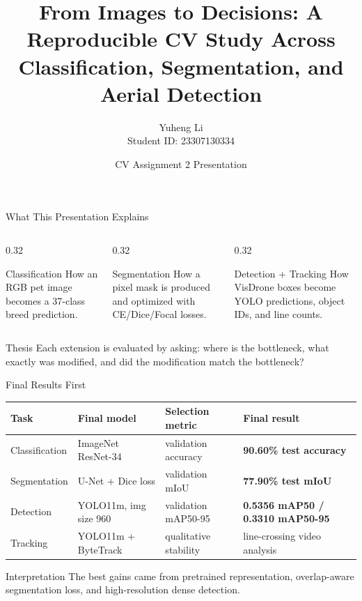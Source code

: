 \documentclass[aspectratio=169,9pt]{beamer}
\title[CV Assignment 2]{From Images to Decisions: A Reproducible CV Study Across Classification, Segmentation, and Aerial Detection}
\author[Yuheng Li]{\texorpdfstring{Yuheng Li\\Student ID: 23307130334}{Yuheng Li, Student ID: 23307130334}}
\institute{GitHub: \href{https://github.com/yuheng-li-ai/CV_Midterm}{CV\_Midterm}\\ModelScope: \href{https://www.modelscope.cn/models/yuhengli/cv-hw2-final-model}{cv-hw2-final-model}}
\date{CV Assignment 2 Presentation}
\begin{document}
\begin{frame}
  \titlepage
\end{frame}

\begin{frame}{What This Presentation Explains}
  \begin{columns}[T]
    \begin{column}{0.32\textwidth}
      \begin{block}{Classification}
        How an RGB pet image becomes a 37-class breed prediction.
      \end{block}
    \end{column}
    \begin{column}{0.32\textwidth}
      \begin{block}{Segmentation}
        How a pixel mask is produced and optimized with CE/Dice/Focal losses.
      \end{block}
    \end{column}
    \begin{column}{0.32\textwidth}
      \begin{block}{Detection + Tracking}
        How VisDrone boxes become YOLO predictions, object IDs, and line counts.
      \end{block}
    \end{column}
  \end{columns}
  \vspace{0.7em}
  \begin{block}{Thesis}
    Each extension is evaluated by asking: where is the bottleneck, what exactly was modified, and did the modification match the bottleneck?
  \end{block}
\end{frame}

\begin{frame}{Final Results First}
  \begin{table}
    \centering
    \small
    \begin{tabular}{llll}
      \toprule
      Task & Final model & Selection metric & Final result\\
      \midrule
      Classification & ImageNet ResNet-34 & validation accuracy & \textbf{90.60\% test accuracy}\\
      Segmentation & U-Net + Dice loss & validation mIoU & \textbf{77.90\% test mIoU}\\
      Detection & YOLO11m, img size 960 & validation mAP50-95 & \textbf{0.5356 mAP50 / 0.3310 mAP50-95}\\
      Tracking & YOLO11m + ByteTrack & qualitative stability & line-crossing video analysis\\
      \bottomrule
    \end{tabular}
  \end{table}
  \begin{block}{Interpretation}
    The best gains came from pretrained representation, overlap-aware segmentation loss, and high-resolution dense detection.
  \end{block}
\end{frame}
\end{document}
